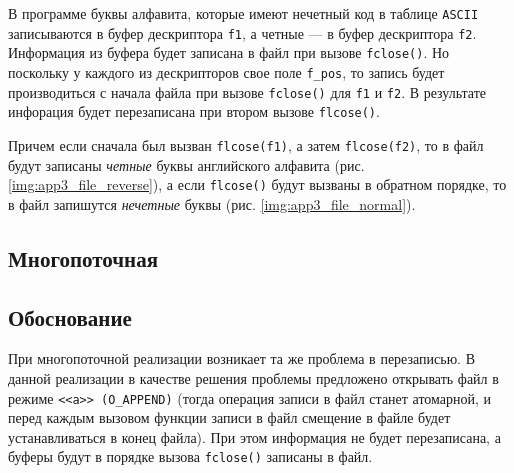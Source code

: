 В программе буквы алфавита, которые имеют нечетный код в таблице \texttt{ASCII} записываются в буфер дескриптора \texttt{f1}, а четные --- в буфер дескриптора \texttt{f2}. Информация из буфера будет записана в файл при вызове \texttt{fclose()}. Но поскольку у каждого из дескрипторов свое поле \texttt{f\_pos}, то запись будет производиться с начала файла при вызове \texttt{fclose()} для \texttt{f1} и \texttt{f2}. В результате инфорация будет перезаписана при втором вызове \texttt{flcose()}.

Причем если сначала был вызван \texttt{flcose(f1)}, а затем \texttt{flcose(f2)}, то в файл будут записаны \textit{четные} буквы английского алфавита (рис. \ref{img:app3_file_reverse}), а если \texttt{flcose()} будут вызваны в обратном порядке, то в файл запишутся \textit{нечетные} буквы (рис. \ref{img:app3_file_normal}).





\subsection{Многопоточная}

\begin{center}
    \captionsetup{justification=raggedright,singlelinecheck=off}
    
\end{center}

\vspace{-1.5cm}
\subsection{Обоснование}
\vspace{-0.7cm}

При многопоточной реализации возникает та же проблема в перезаписью. В данной реализации в качестве решения проблемы предложено открывать файл в режиме \texttt{<<a>> (O\_APPEND)} (тогда операция записи в файл станет атомарной, и перед каждым вызовом функции записи в файл смещение в файле будет устанавливаться в конец файла). При этом информация не будет перезаписана, а буферы будут в порядке вызова \texttt{fclose()} записаны в файл.



